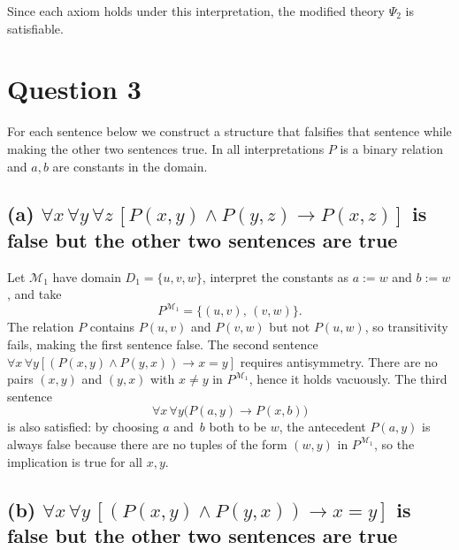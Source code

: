 \documentclass[12pt]{article}
\begin{document}
Since each axiom holds under this interpretation, the modified theory $\Psi_2$ is satisfiable.

\section*{Question 3}

For each sentence below we construct a structure that falsifies that sentence while making the other two sentences true.  In all interpretations $P$ is a binary relation and $a,b$ are constants in the domain.

\subsection*{(a) $\forall x\,\forall y\,\forall z\,[P(x,y)\wedge P(y,z)\to P(x,z)]$ is false but the other two sentences are true}

Let $\mathcal{M}_1$ have domain $D_1=\{u,v,w\}$, interpret the constants as $a:=w$ and $b:=w$, and take
\[
P^{\mathcal{M}_1} = \{(u,v),\,(v,w)\}.
\]
The relation $P$ contains $P(u,v)$ and $P(v,w)$ but not $P(u,w)$, so transitivity fails, making the first sentence false.  The second sentence $\forall x\,\forall y[(P(x,y)\wedge P(y,x))\to x=y]$ requires antisymmetry.  There are no pairs $(x,y)$ and $(y,x)$ with $x\neq y$ in $P^{\mathcal{M}_1}$, hence it holds vacuously.  The third sentence
\[
\forall x\,\forall y\bigl(P(a,y)\to P(x,b)\bigr)
\]
is also satisfied:  by choosing $a$ and~$b$ both to be $w$, the antecedent $P(a,y)$ is always false because there are no tuples of the form $(w,y)$ in $P^{\mathcal{M}_1}$, so the implication is true for all $x,y$.

\subsection*{(b) $\forall x\,\forall y\,[(P(x,y)\wedge P(y,x))\to x=y]$ is false but the other two sentences are true}
\end{document}
